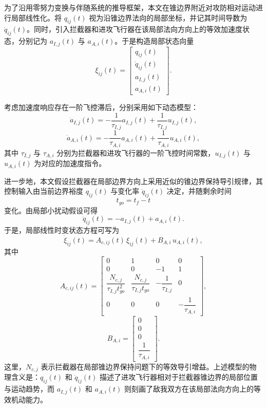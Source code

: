 为了沿用零努力变换与伴随系统的推导框架，本文在锥边界附近对攻防相对运动进行局部线性化。将 $q_{ij}(t)$ 视为沿锥边界法向的局部坐标，并记其时间导数为 $\dot q_{ij}(t)$。同时，引入拦截器和进攻飞行器在该局部法向方向上的等效加速度状态，分别记为 $a_{I,j}(t)$ 与 $a_{A,i}(t)$。于是构造局部状态向量
\begin{equation}
\xi_{ij}(t)=
\begin{bmatrix}
q_{ij}(t)\\
\dot q_{ij}(t)\\
a_{I,j}(t)\\
a_{A,i}(t)
\end{bmatrix}.
\end{equation}

考虑加速度响应存在一阶飞控滞后，分别采用如下动态模型：
\begin{equation}
\dot a_{I,j}(t)
=
-\frac{1}{\tau_{I,j}}a_{I,j}(t)
+
\frac{1}{\tau_{I,j}}u_{I,j}(t),
\end{equation}
\begin{equation}
\dot a_{A,i}(t)
=
-\frac{1}{\tau_{A,i}}a_{A,i}(t)
+
\frac{1}{\tau_{A,i}}u_{A,i}(t),
\end{equation}
其中 $\tau_{I,j}$ 与 $\tau_{A,i}$ 分别为拦截器和进攻飞行器的一阶飞控时间常数，$u_{I,j}(t)$ 与 $u_{A,i}(t)$ 为对应的加速度指令。

进一步地，本文假设拦截器在局部边界方向上采用近似的锥边界保持导引规律，其控制输入由当前边界裕度 $q_{ij}(t)$ 与变化率 $\dot q_{ij}(t)$ 决定，并随剩余时间
\begin{equation}
t_{go}=t_f-t
\end{equation}
变化。由局部小扰动假设可得
\begin{equation}
\ddot q_{ij}(t)=-a_{I,j}(t)+a_{A,i}(t).
\end{equation}
于是，局部线性时变状态方程可写为
\begin{equation}
\dot \xi_{ij}(t)
=
A_{c,ij}(t)\,\xi_{ij}(t)
+
B_{A,i}\,u_{A,i}(t),
\end{equation}
其中
\begin{equation}
A_{c,ij}(t)
=
\begin{bmatrix}
0 & 1 & 0 & 0\\
0 & 0 & -1 & 1\\
\dfrac{N_{c,j}}{\tau_{I,j} t_{go}^{2}}
&
\dfrac{N_{c,j}}{\tau_{I,j} t_{go}}
&
-\dfrac{1}{\tau_{I,j}}
&
0\\[1ex]
0 & 0 & 0 & -\dfrac{1}{\tau_{A,i}}
\end{bmatrix},
\end{equation}
\begin{equation}
B_{A,i}
=
\begin{bmatrix}
0\\
0\\
0\\
\dfrac{1}{\tau_{A,i}}
\end{bmatrix}.
\end{equation}
这里，$N_{c,j}$ 表示拦截器在局部锥边界保持问题下的等效导引增益。上述模型的物理含义是：$q_{ij}(t)$ 和 $\dot q_{ij}(t)$ 描述了进攻飞行器相对于拦截器锥边界的局部位置与运动趋势，而 $a_{I,j}(t)$ 和 $a_{A,i}(t)$ 则刻画了敌我双方在该局部法向方向上的等效机动能力。

